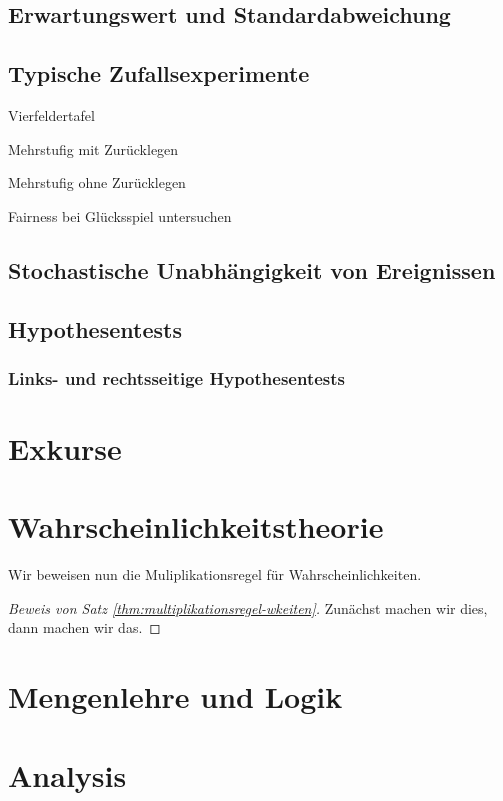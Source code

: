 \section{Erwartungswert und Standardabweichung}

\section{Typische Zufallsexperimente}
Vierfeldertafel

Mehrstufig mit Zurücklegen

Mehrstufig ohne Zurücklegen 

Fairness bei Glücksspiel untersuchen

\section{Stochastische Unabhängigkeit von Ereignissen}

\section{Hypothesentests}

\subsection{Links- und rechtsseitige Hypothesentests}



\appendix
\chapter{Exkurse}

\chapter{Wahrscheinlichkeitstheorie}
\lipsum[5-10]
Wir beweisen nun die Muliplikationsregel für Wahrscheinlichkeiten. 
\begin{proof}[Beweis von Satz \ref{thm:multiplikationsregel-wkeiten}]\label{pro:multiplikationsregel-wkeiten} 
    Zunächst machen wir dies, dann machen wir das.
\end{proof}

\chapter{Mengenlehre und Logik}

\chapter{Analysis}